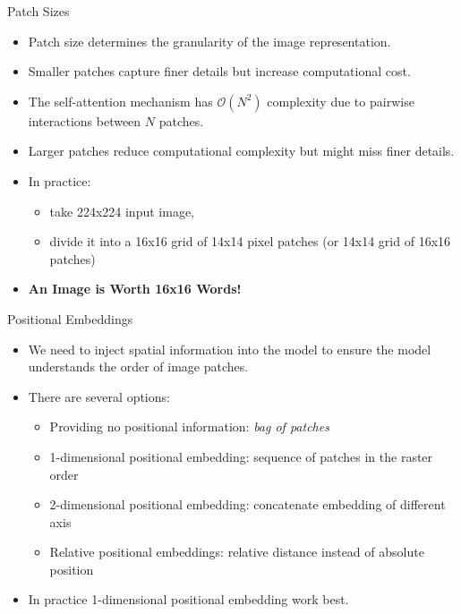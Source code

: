 \begin{frame}{Patch Sizes}
    \begin{itemize}
        \item Patch size determines the granularity of the image representation.
        \item Smaller patches capture finer details but increase computational cost.
        \item The self-attention mechanism has $\mathcal{O}(N^2)$ complexity due to pairwise interactions between $N$ patches. 
        \item Larger patches reduce computational complexity but might miss finer details.
        \item In practice: 
            \begin{itemize}
                \item take 224x224 input image,
                \item divide it into a 16x16 grid of 14x14 pixel patches (or 14x14 grid of 16x16 patches)
            \end{itemize} 
        \item \textbf{An Image is Worth 16x16 Words!}
    \end{itemize}
\end{frame}


\begin{frame}{Positional Embeddings}
    \begin{itemize}
        \item We need to inject spatial information into the model to ensure the model understands the order of image patches.
        \item There are several options: 
        \begin{itemize}
            \item Providing no positional information: \textit{bag of patches}
            \item 1-dimensional positional embedding: sequence of patches in the raster order
            \item 2-dimensional positional embedding: concatenate embedding of different axis
            \item Relative positional embeddings: relative distance instead of absolute position
        \end{itemize}
        \item In practice 1-dimensional positional embedding work best.
    \end{itemize}
\end{frame}




